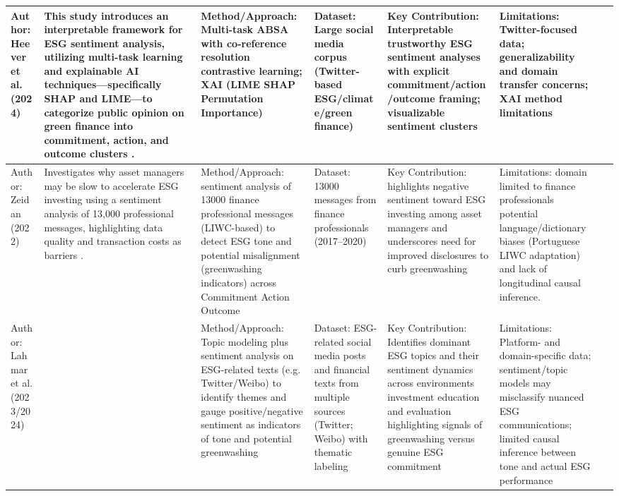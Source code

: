 \documentclass{article}
\begin{document}
\begin{landscape}
\begin{longtable}{p{1.8cm}
p{2.6cm}
p{3.4cm}
p{2.6cm}
p{3.5cm}
p{3.5cm}
p{0.8cm}}
Author: Heever et al. (2024) & This study introduces an interpretable framework for ESG sentiment analysis, utilizing multi-task learning and explainable AI techniques—specifically SHAP and LIME—to categorize public opinion on green finance into commitment, action, and outcome clusters  \parencite{wihan_van_der_heever_44c76c99}. & Method/Approach: Multi-task ABSA with co-reference resolution contrastive learning; XAI (LIME SHAP Permutation Importance) & Dataset: Large social media corpus (Twitter-based ESG/climate/green finance) & Key Contribution: Interpretable trustworthy ESG sentiment analyses with explicit commitment/action/outcome framing; visualizable sentiment clusters & Limitations: Twitter-focused data; generalizability and domain transfer concerns; XAI method limitations & ~ \\ \hline
Author: Zeidan (2022) & Investigates why asset managers may be slow to accelerate ESG investing using a sentiment analysis of 13,000 professional messages, highlighting data quality and transaction costs as barriers  \parencite{rodrigo_zeidan_780f3cd1}. & Method/Approach: sentiment analysis of 13000 finance professional messages (LIWC-based) to detect ESG tone and potential misalignment (greenwashing indicators) across Commitment Action Outcome & Dataset: 13000 messages from finance professionals (2017–2020) & Key Contribution: highlights negative sentiment toward ESG investing among asset managers and underscores need for improved disclosures to curb greenwashing & Limitations: domain limited to finance professionals potential language/dictionary biases (Portuguese LIWC adaptation) and lack of longitudinal causal inference. & ~ \\ \hline
Author: Lahmar et al. (2023/2024) & ~ & Method/Approach: Topic modeling plus sentiment analysis on ESG-related texts (e.g. Twitter/Weibo) to identify themes and gauge positive/negative sentiment as indicators of tone and potential greenwashing & Dataset: ESG-related social media posts and financial texts from multiple sources (Twitter; Weibo) with thematic labeling & Key Contribution: Identifies dominant ESG topics and their sentiment dynamics across environments investment education and evaluation highlighting signals of greenwashing versus genuine ESG commitment & Limitations: Platform- and domain-specific data; sentiment/topic models may misclassify nuanced ESG communications; limited causal inference between tone and actual ESG performance & ~ \\ \hline

\end{longtable}
\end{landscape}
\end{document}
